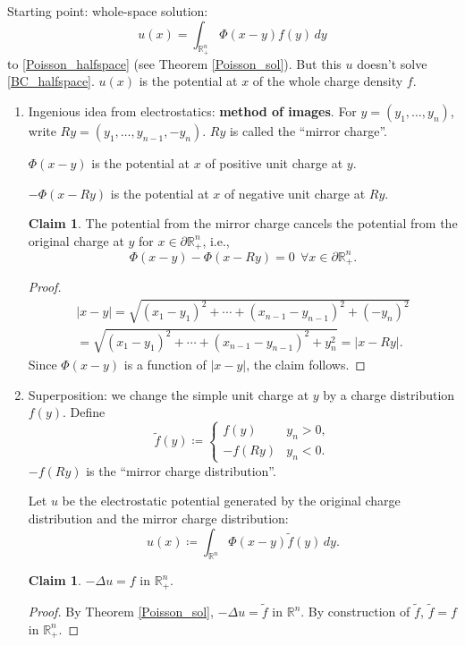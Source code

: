\documentclass[12pt]{article}
\theoremstyle{definition}
\newtheorem*{claim*}{Claim}
\newtheorem{claim}{Claim}
\begin{document}
Starting point: whole-space solution:
\[u(x)=\int_{\mathbb R_+^n}\Phi(x-y)f(y)\,dy\]
to \eqref{Poisson_halfspace} (see Theorem \ref{Poisson_sol}). But this $u$ doesn't solve \eqref{BC_halfspace}. $u(x)$ is the potential at $x$ of the whole charge density $f$.

\begin{enumerate}[label=\arabic*.]
\item\label{method_images} Ingenious idea from electrostatics: \textbf{method of images}. For $y=(y_1,\ldots,y_n)$, write $Ry=(y_1,\ldots,y_{n-1},-y_n)$. $Ry$ is called the ``mirror charge''.

$\Phi(x-y)$ is the potential at $x$ of positive unit charge at $y$.

$-\Phi(x-Ry)$ is the potential at $x$ of negative unit charge at $Ry$.

\begin{claim*}
The potential from the mirror charge cancels the potential from the original charge at $y$ for $x\in\partial\mathbb R_+^n$, i.e.,
\[\Phi(x-y)-\Phi(x-Ry)=0\ \ \forall x\in\partial\mathbb R_+^n.\]
\end{claim*}

\begin{proof}
\begin{multline*}
|x-y|=\sqrt{(x_1-y_1)^2+\cdots+(x_{n-1}-y_{n-1})^2+(-y_n)^2}\\
=\sqrt{(x_1-y_1)^2+\cdots+(x_{n-1}-y_{n-1})^2+y_n^2}=|x-Ry|.
\end{multline*}
Since $\Phi(x-y)$ is a function of $|x-y|$, the claim follows.
\end{proof}

\item Superposition: we change the simple unit charge at $y$ by a charge distribution $f(y)$. Define
\[\tilde f(y)\coloneqq\left\{\begin{array}{cc}f(y)&y_n>0,\\-f(Ry)&y_n<0.\end{array}\right.\]
$-f(Ry)$ is the ``mirror charge distribution''.

Let $u$ be the electrostatic potential generated by the original charge distribution and the mirror charge distribution:
\[u(x)\coloneqq\int_{\mathbb R^n}\Phi(x-y)\tilde f(y)\,dy.\]

\setcounter{claim}{0}
\begin{claim}
$-\Delta u=f$ in $\mathbb R_+^n$.
\end{claim}

\begin{proof}
By Theorem \ref{Poisson_sol}, $-\Delta u=\tilde f$ in $\mathbb R^n$. By construction of $\tilde f$, $\tilde f=f$ in $\mathbb R_+^n$.
\end{proof}


\end{enumerate}
\end{document}
